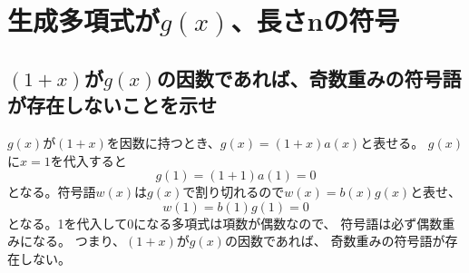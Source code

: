 \documentclass[a4paper,11pt]{jsarticle}
\begin{document}
\section{生成多項式が$g(x)$、長さnの符号}
\subsection{$(1+x)$が$g(x)$の因数であれば、奇数重みの符号語が存在しないことを示せ}
$g(x)$が$(1+x)$を因数に持つとき、$g(x)=(1+x)a(x)$と表せる。
$g(x)$に$x=1$を代入すると
\[
  g(1)=(1+1)a(1)=0
\]
となる。符号語$w(x)$は$g(x)$で割り切れるので$w(x)=b(x)g(x)$と表せ、
\[
  w(1)=b(1)g(1)=0
\]
となる。1を代入して0になる多項式は項数が偶数なので、
符号語は必ず偶数重みになる。
つまり、$(1+x)$が$g(x)$の因数であれば、
奇数重みの符号語が存在しない。
\end{document}
